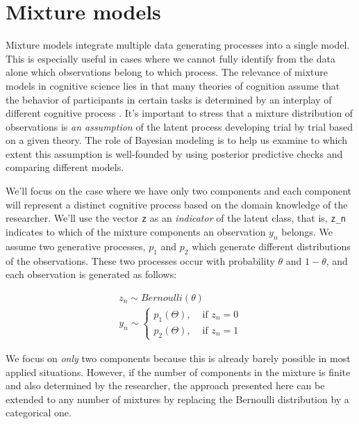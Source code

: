\documentclass[12pt,]{krantz}
\theoremstyle{definition}
\theoremstyle{definition}
\theoremstyle{definition}
\theoremstyle{remark}
\begin{document}
\chapter{Mixture models}\label{ch:mixture}

Mixture models integrate multiple data generating processes into a
single model. This is especially useful in cases where we cannot fully
identify from the data alone which observations belong to which process.
The relevance of mixture models in cognitive science lies in that many
theories of cognition assume that the behavior of participants in
certain tasks is determined by an interplay of different cognitive
process \citetext{\citealp[e.g., reaction times in schizophrenia
in][]{levy1993eye}; \citealp[retrieval from memory in sentence
processing
in][]{Mcelree2000}; \citealp{nicenboimModelsRetrievalSentence2018}; \citealp[fast
choices in][]{Ollman1966}; \citealp{DutilhEtAl2011}}. It's important to
stress that a mixture distribution of observations is \emph{an
assumption} of the latent process developing trial by trial based on a
given theory. The role of Bayesian modeling is to help us examine to
which extent this assumption is well-founded by using posterior
predictive checks and comparing different models.

We'll focus on the case where we have only two components and each
component will represent a distinct cognitive process based on the
domain knowledge of the researcher. We'll use the vector \texttt{z} as
an \emph{indicator} of the latent class, that is, \texttt{z\_n}
indicates to which of the mixture components an observation \(y_n\)
belongs. We assume two generative processes, \(p_1\) and \(p_2\) which
generate different distributions of the observations. These two
processes occur with probability \(\theta\) and \(1-\theta\), and each
observation is generated as follows:

\begin{equation}
\begin{aligned}
z_n \sim Bernoulli(\theta)\\
y_n \sim 
\begin{cases}
p_1(\Theta), & \text{ if } z_n =0 \\
p_2(\Theta), & \text{ if } z_n=1
\end{cases}
\end{aligned}
\end{equation}

We focus on \emph{only} two components because this is already barely
possible in most applied situations. However, if the number of
components in the mixture is finite and also determined by the
researcher, the approach presented here can be extended to any number of
mixtures by replacing the Bernoulli distribution by a categorical one.
\end{document}
